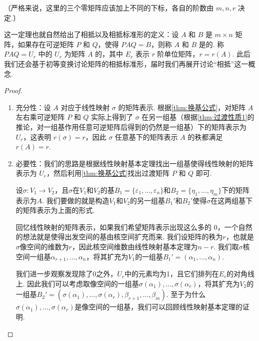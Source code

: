 （严格来说，这里的三个零矩阵应该加上不同的下标，各自的阶数由 $m, n, r$ 决定.）

这一定理也就自然给出了相抵以及相抵标准形的定义：设 $A$ 和 $B$ 是 $m \times n$ 矩阵，如果存在可逆矩阵 $P$ 和 $Q$，使得 $PAQ = B$，则称 $A$ 和 $B$ 是的. 称 $PAQ = U_r$ 中的 $U_r$ 为矩阵 $A$ 的，其中 $E_r$ 表示 $r$ 阶单位矩阵，$r = r(A)$. 此后我们还会基于初等变换讨论矩阵的相抵标准形，届时我们再展开讨论``相抵''这一概念.

\begin{proof}
    \begin{enumerate}
        \item 充分性：设 $A$ 对应于线性映射 $\sigma$ 的矩阵表示. 根据\autoref{thm:换基公式}，对矩阵 $A$ 左右乘可逆矩阵 $P$ 和 $Q$ 实际上得到了 $\sigma$ 在另一组基（根据\autoref{thm:过渡性质1}的推论，对一组基作用任意可逆矩阵后得到的仍然是一组基）下的矩阵表示为 $U_r$，这表明 $r(\sigma) = r$，因此 $\sigma$ 任意基下的矩阵表示 $A$ 的秩都满足 $r(A) = r$.

        \item 必要性：我们的思路是根据线性映射基本定理找出一组基使得线性映射的矩阵表示为 $U_r$，然后利用\autoref{thm:换基公式}找出过渡矩阵 $P$ 和 $Q$ 即可.

        设$\sigma:V_1\to V_2$，且$\sigma$在$V_1$和$V_2$的基$B_1=\{\varepsilon_1,\ldots,\varepsilon_n\}$和$B_2=\{\eta_1,\ldots,\eta_m\}$下的矩阵表示为$A$. 我们要做的就是构造$V_1$和$V_2$的另一组基$B_1'$和$B_2'$使得$\sigma$在这两组基下的矩阵表示为上面的形式.

        回忆线性映射的矩阵表示，如果我们希望矩阵表示出现这么多的 $0$，一个自然的想法就是使得出发空间的基由核空间扩充而来. 我们设矩阵的秩为$r$，也就是$\sigma$像空间的维数为$r$，因此核空间维数由线性映射基本定理为$n-r$. 我们取$\sigma$核空间一组基$\alpha_{r+1},\ldots,\alpha_n$，将其扩充为$V_1$的一组基$B_1'=(\alpha_1,\ldots,\alpha_n)$.

        我们进一步观察发现除了0之外，$U_r$中的元素均为1，且它们排列在$E_r$的对角线上. 因此我们可以考虑取像空间的一组基$\sigma(\alpha_1),\ldots,\sigma(\alpha_r)$，将其扩充为$V_2$的一组基$B_2'=(\sigma(\alpha_1),\ldots,\sigma(\alpha_r),\beta_{r+1},\ldots,\beta_m)$. 至于为什么$\sigma(\alpha_1),\ldots,\sigma(\alpha_r)$是像空间的一组基，我们可以回顾线性映射基本定理的证明.


\end{enumerate}
\end{proof}
